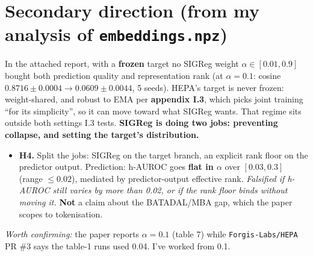 \documentclass[9pt]{extarticle}
\newcommand{\hl}[1]{\textcolor{acc}{\textbf{#1}}}
\newcommand{\B}[1]{\textbf{#1}}
\begin{document}
\section{Secondary direction (from my analysis of \texttt{embeddings.npz})}

In the attached report, with a \B{frozen} target no SIGReg weight $\alpha\in[0.01,0.9]$ bought both prediction
quality and representation rank (at $\alpha{=}0.1$: cosine $0.8716{\pm}0.0004$$\to$$0.0609{\pm}0.0044$, 5 seeds). HEPA's target is never
frozen: weight-shared, and robust to EMA per \B{appendix I.3}, which picks joint training ``for its simplicity'',
so it can move toward what SIGReg wants. That regime sits outside both settings I.3 tests.
\hl{SIGReg is doing two jobs: preventing collapse, and setting the target's distribution.}

\begin{itemize}
\item \B{H4.} Split the jobs: SIGReg on the target branch, an explicit rank floor on the predictor output.
      Prediction: h-AUROC goes \B{flat in $\alpha$} over $[0.03,0.3]$ (range $\le 0.02$), mediated by
      predictor-output effective rank. \emph{Falsified if h-AUROC still varies by more than 0.02, or if the rank
      floor binds without moving it.} \B{Not} a claim about the BATADAL/MBA gap, which the paper scopes to
      tokenisation.
\end{itemize}

{\footnotesize\emph{Worth confirming:} the paper reports $\alpha{=}0.1$ (table 7) while
\texttt{Forgis-Labs/HEPA} PR \#3 says the table-1 runs used 0.04. I've worked from 0.1.}
\end{document}
